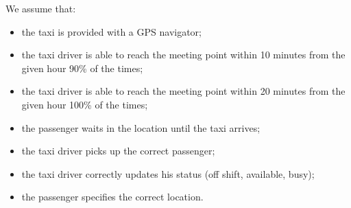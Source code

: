 We assume that:
\begin{itemize}
\item the taxi is provided with a GPS navigator;
\item the taxi driver is able to reach the meeting point within 10 minutes from the given hour 90\% of the times;
\item the taxi driver is able to reach the meeting point within 20 minutes from the given hour 100\% of the times;
\item the passenger waits in the location until the taxi arrives;
\item the taxi driver picks up the correct passenger;
\item the taxi driver correctly updates his status (off shift, available, busy);
\item the passenger specifies the correct location.
\end{itemize}

